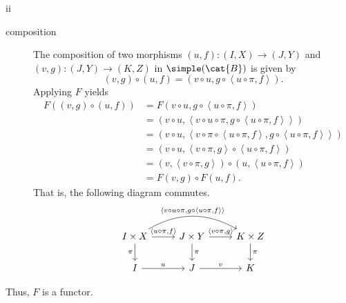 \begin{partsolution}{ii}
\begin{description}
\item[composition]
The composition of two morphisms \((u, f) : (I, X) \to (J, Y)\) and \((v, g) : (J, Y) \to (K, Z)\) in \(\simple(\cat{B})\) is given by
\begin{equation*}
(v, g) \circ (u, f) = (v \circ u, g \circ \left\langle u \circ \pi, f\right\rangle).
\end{equation*}
Applying \(F\) yields
\begin{align*}
F\left((v, g) \circ (u, f)\right)
&= F\left(v \circ u, g \circ \left\langle u \circ \pi, f\right\rangle\right) \\
&= \left(v \circ u, \left\langle v \circ u \circ \pi, g \circ \left\langle u \circ \pi, f\right\rangle\right\rangle\right) \\
&= \left(v \circ u, \left\langle v \circ \pi \circ \left\langle u \circ \pi, f\right\rangle, g \circ \left\langle u \circ \pi, f\right\rangle\right\rangle\right) \\
&= \left(v \circ u, \left\langle v\circ\pi, g\right\rangle \circ \left\langle u\circ\pi, f\right\rangle\right) \\
&= \left(v, \left\langle v\circ \pi, g\right\rangle\right) \circ \left(u, \left\langle u\circ\pi, f\right\rangle\right) \\
&= F(v, g) \circ F(u, f).
\end{align*}
That is, the following diagram commutes.
\begin{equation*}
\begin{tikzcd}
I \times X \arrow[r, "{\left\langle u\circ\pi, f\right\rangle}"] \arrow[d, "\pi"{left}] \arrow[rr, bend left, "{\left\langle v \circ u \circ \pi, g \circ \left\langle u \circ \pi, f\right\rangle\right\rangle}"{above}]
& J \times Y\arrow[r, "{\left\langle v\circ\pi, g\right\rangle}"]  \arrow[d, "\pi"]
& K \times Z \arrow[d, "\pi"{right}] \\
I \arrow[r, "u"]
& J \arrow[r, "v"]
& K
\end{tikzcd}
\end{equation*}
\end{description}
Thus, \(F\) is a functor.


\end{partsolution}
